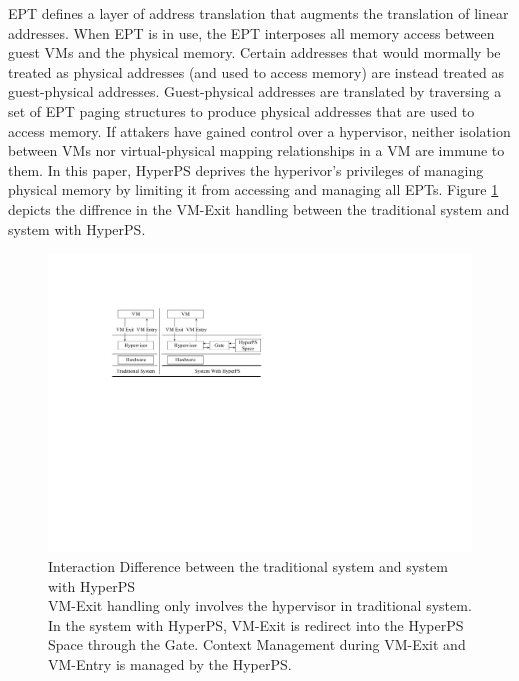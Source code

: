 EPT defines a layer of address translation that augments the translation of linear addresses. 
When EPT is in use, the EPT interposes all memory access between guest VMs and the physical memory. 
Certain addresses that would mormally be treated as physical addresses (and used to access memory) are instead treated as guest-physical addresses. Guest-physical addresses are translated by traversing a set of EPT paging structures to produce physical addresses that are used to access memory.
If attakers have gained control over a hypervisor, 
neither isolation between VMs nor virtual-physical mapping relationships in a VM are immune to them. 
In this paper, HyperPS deprives the hyperivor's privileges of managing physical memory by limiting it from accessing and managing all EPTs. 
Figure \ref{fig:inter} depicts the diffrence in the VM-Exit handling between the traditional system and system with HyperPS.
\begin{figure}[htpb]
    \centering
    \includegraphics[width=0.8\linewidth]{IMG/interaction.pdf}
    \caption{Interaction Difference between the traditional system and system with HyperPS \\ VM-Exit handling only involves the hypervisor in traditional system. In the system with HyperPS, VM-Exit is redirect into the HyperPS Space through the Gate. Context Management during VM-Exit and VM-Entry is managed by the HyperPS.}%
    \label{fig:inter}
\end{figure}


